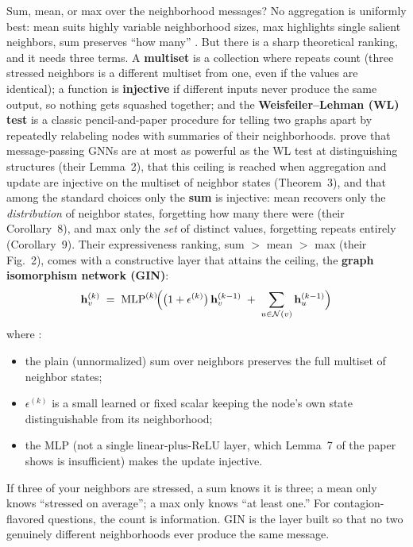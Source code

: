 Sum, mean, or max over the neighborhood messages? No aggregation is uniformly best: mean suits highly variable neighborhood sizes, max highlights single salient neighbors, sum preserves ``how many'' \citep{SanchezLengeling2021}. But there is a sharp theoretical ranking, and it needs three terms. A \textbf{multiset} is a collection where repeats count (three stressed neighbors is a different multiset from one, even if the values are identical); a function is \textbf{injective} if different inputs never produce the same output, so nothing gets squashed together; and the \textbf{Weisfeiler--Lehman (WL) test} is a classic pencil-and-paper procedure for telling two graphs apart by repeatedly relabeling nodes with summaries of their neighborhoods. \citet{XuHuLeskovecJegelka2019} prove that message-passing GNNs are at most as powerful as the WL test at distinguishing structures (their Lemma~2), that this ceiling is reached when aggregation and update are injective on the multiset of neighbor states (Theorem~3), and that among the standard choices only the \textbf{sum} is injective: mean recovers only the \emph{distribution} of neighbor states, forgetting how many there were (their Corollary~8), and max only the \emph{set} of distinct values, forgetting repeats entirely (Corollary~9). Their expressiveness ranking, sum $>$ mean $>$ max (their Fig.~2), comes with a constructive layer that attains the ceiling, the \textbf{graph isomorphism network (GIN)}:
\begin{equation}\label{eq:gnn:gin}
  \mathbf{h}_v^{(k)} \;=\; \operatorname{MLP}^{(k)}\!\Bigl( \bigl(1 + \epsilon^{(k)}\bigr)\, \mathbf{h}_v^{(k-1)} \;+\; \sum_{u \in \mathcal{N}(v)} \mathbf{h}_u^{(k-1)} \Bigr)
\end{equation}
where \citep[eq.~4.1, p.~5]{XuHuLeskovecJegelka2019}:
\begin{itemize}[nosep]
  \item the plain (unnormalized) sum over neighbors preserves the full multiset of neighbor states;
  \item $\epsilon^{(k)}$ is a small learned or fixed scalar keeping the node's own state distinguishable from its neighborhood;
  \item the MLP (not a single linear-plus-ReLU layer, which Lemma~7 of the paper shows is insufficient) makes the update injective.
\end{itemize}

\begin{intuition}
If three of your neighbors are stressed, a sum knows it is three; a mean only knows ``stressed on average''; a max only knows ``at least one.'' For contagion-flavored questions, the count is information. GIN is the layer built so that no two genuinely different neighborhoods ever produce the same message.
\end{intuition}

